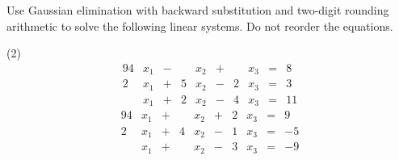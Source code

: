 \documentclass[../../../../Assignments]{subfiles}
\begin{document}
\begin{exercise}\label{exer:3.1.3}
    Use Gaussian elimination with backward substitution and two-digit rounding
    arithmetic to solve the following linear systems. Do not reorder the
    equations.

    \begin{tasks}(2)
        \task
            \begin{alignat*}{9}
                4&x_1 &{}-{}&  &x_2 &{}+{}&  &x_3 &{}={}&  8 \\
                2&x_1 &{}+{}& 5&x_2 &{}-{}& 2&x_3 &{}={}&  3 \\
                 &x_1 &{}+{}& 2&x_2 &{}-{}& 4&x_3 &{}={}& 11
            \end{alignat*}
        \task
            \begin{alignat*}{9}
                4&x_1 &{}+{}&  &x_2 &{}+{}& 2&x_3 &{}={}&  9 \\
                2&x_1 &{}+{}& 4&x_2 &{}-{}& 1&x_3 &{}={}& \num{-5} \\    %
                 &x_1 &{}+{}&  &x_2 &{}-{}& 3&x_3 &{}={}& \num{-9}
            \end{alignat*}
    \end{tasks}
\end{exercise}
\end{document}
